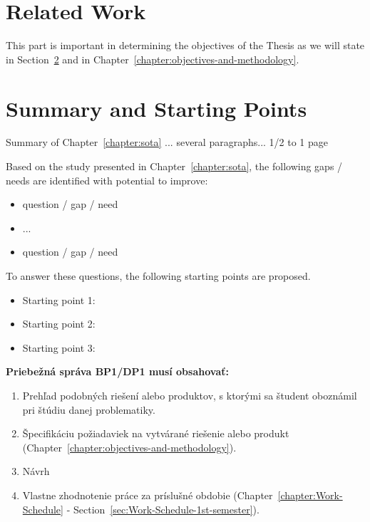 \section{Related Work}
\label{sec:sota-related}

This part is important in determining the objectives of the Thesis as we will state in Section~\ref{sec:sota-summary} and in Chapter~\ref{chapter:objectives-and-methodology}.


\section{Summary and Starting Points}
\label{sec:sota-summary}


Summary of Chapter~\ref{chapter:sota} ... several paragraphs... 1/2 to 1 page

Based on the study presented in Chapter~\ref{chapter:sota}, the following gaps / needs are identified with potential to improve:
\begin{itemize}
    \item question /  gap / need
    \item ...
    \item question /  gap / need
\end{itemize}


To answer these questions, the following starting points are proposed.
\begin{itemize}
    \item Starting point 1:
    \item Starting point 2:
    \item Starting point 3:
\end{itemize}

\newpage
\textbf{Priebežná správa BP1/DP1 musí obsahovať:}
\begin{enumerate}
    \item Prehľad podobných riešení alebo produktov, s ktorými sa študent oboznámil pri štúdiu danej problematiky.
    \item Špecifikáciu požiadaviek na vytvárané riešenie alebo produkt
            (Chapter~\ref{chapter:objectives-and-methodology}).
    \item Návrh
    \item Vlastne zhodnotenie práce za príslušné obdobie 
            (Chapter~\ref{chapter:Work-Schedule} - 
            Section~\ref{sec:Work-Schedule-1st-semester}).
\end{enumerate}
